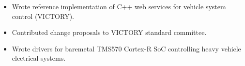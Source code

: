 \begin{itemize}
    \item Wrote reference implementation of C++ web services for vehicle system control (VICTORY).
    \item Contributed change proposals to VICTORY standard committee.
    \item Wrote drivers for baremetal TMS570 Cortex-R SoC controlling heavy vehicle electrical systems.
\end{itemize}

